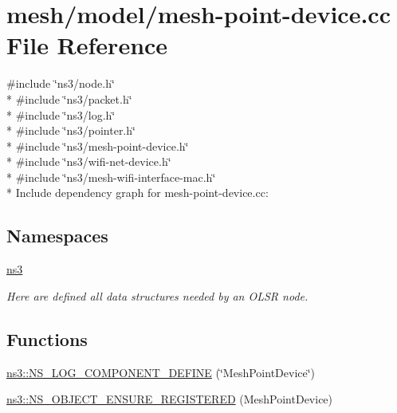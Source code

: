 \hypertarget{mesh-point-device_8cc}{}\section{mesh/model/mesh-\/point-\/device.cc File Reference}
\label{mesh-point-device_8cc}
{\ttfamily \#include \char`\"{}ns3/node.\+h\char`\"{}}\\*
{\ttfamily \#include \char`\"{}ns3/packet.\+h\char`\"{}}\\*
{\ttfamily \#include \char`\"{}ns3/log.\+h\char`\"{}}\\*
{\ttfamily \#include \char`\"{}ns3/pointer.\+h\char`\"{}}\\*
{\ttfamily \#include \char`\"{}ns3/mesh-\/point-\/device.\+h\char`\"{}}\\*
{\ttfamily \#include \char`\"{}ns3/wifi-\/net-\/device.\+h\char`\"{}}\\*
{\ttfamily \#include \char`\"{}ns3/mesh-\/wifi-\/interface-\/mac.\+h\char`\"{}}\\*
Include dependency graph for mesh-\/point-\/device.cc\+:
\subsection*{Namespaces}
\begin{DoxyCompactItemize}
\item 
 \hyperlink{namespacens3}{ns3}
\begin{DoxyCompactList}\small\item\em Here are defined all data structures needed by an O\+L\+SR node. \end{DoxyCompactList}\end{DoxyCompactItemize}
\subsection*{Functions}
\begin{DoxyCompactItemize}
\item 
\hyperlink{namespacens3_a5d0744971715487c2cc2043e2159d0cc}{ns3\+::\+N\+S\+\_\+\+L\+O\+G\+\_\+\+C\+O\+M\+P\+O\+N\+E\+N\+T\+\_\+\+D\+E\+F\+I\+NE} (\char`\"{}Mesh\+Point\+Device\char`\"{})
\item 
\hyperlink{namespacens3_a3395b0e08185c3e8923f7aa571c3573e}{ns3\+::\+N\+S\+\_\+\+O\+B\+J\+E\+C\+T\+\_\+\+E\+N\+S\+U\+R\+E\+\_\+\+R\+E\+G\+I\+S\+T\+E\+R\+ED} (Mesh\+Point\+Device)
\end{DoxyCompactItemize}
